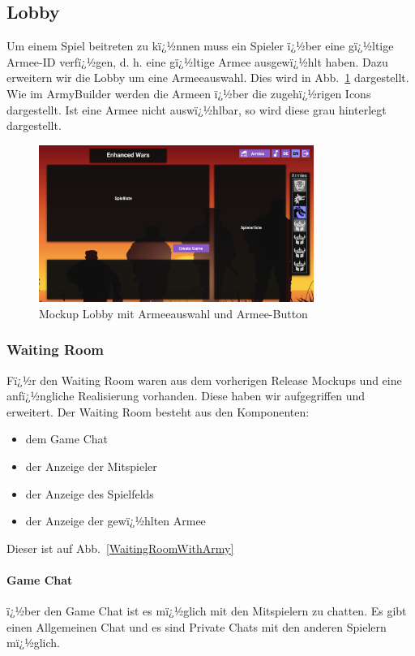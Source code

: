 \documentclass[12pt, titlepage]{scrartcl}
\newcommand{\Abb}[1]{%
	Abb.\ \ref{#1}%
}
\begin{document}
		\subsection{Lobby}
		Um einem Spiel beitreten zu kï¿½nnen muss ein Spieler ï¿½ber eine gï¿½ltige Armee-ID verfï¿½gen, d. h. eine gï¿½ltige Armee ausgewï¿½hlt haben. Dazu erweitern wir die Lobby um eine Armeeauswahl. Dies wird in \Abb{Lobby_with_Army} dargestellt. Wie im ArmyBuilder werden die Armeen ï¿½ber die zugehï¿½rigen Icons dargestellt. Ist eine Armee nicht auswï¿½hlbar, so wird diese grau hinterlegt dargestellt. 
		\begin{figure}[H] 
			\centering
			\includegraphics[width=0.8\textwidth]{Lobby_mit_Army_Button_und_Armeeliste.png}
			\caption{Mockup Lobby mit Armeeauswahl und Armee-Button}
			\label{Lobby_with_Army}
		\end{figure}
		
		\subsubsection{Waiting Room}
		Fï¿½r den Waiting Room waren aus dem vorherigen Release Mockups und eine anfï¿½ngliche Realisierung vorhanden. Diese haben wir aufgegriffen und erweitert. Der Waiting Room besteht aus den Komponenten:
		\begin{itemize}
			\item dem Game Chat
			\item der Anzeige der Mitspieler
			\item der Anzeige des Spielfelds
			\item der Anzeige der gewï¿½hlten Armee
		\end{itemize}
		Dieser ist auf \Abb{WaitingRoomWithArmy}
		\paragraph{Game Chat}
		ï¿½ber den Game Chat ist es mï¿½glich mit den Mitspielern zu chatten. Es gibt einen Allgemeinen Chat und es sind Private Chats mit den anderen Spielern mï¿½glich.
\end{document}
